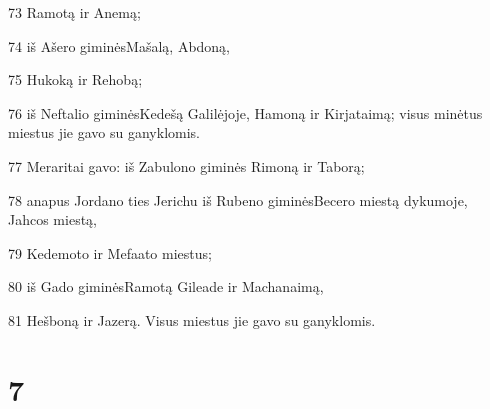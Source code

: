 \par 73 Ramotą ir Anemą; 
\par 74 iš Ašero giminės­Mašalą, Abdoną, 
\par 75 Hukoką ir Rehobą; 
\par 76 iš Neftalio giminės­Kedešą Galilėjoje, Hamoną ir Kirjataimą; visus minėtus miestus jie gavo su ganyklomis. 
\par 77 Meraritai gavo: iš Zabulono giminės Rimoną ir Taborą; 
\par 78 anapus Jordano ties Jerichu iš Rubeno giminės­Becero miestą dykumoje, Jahcos miestą, 
\par 79 Kedemoto ir Mefaato miestus; 
\par 80 iš Gado giminės­Ramotą Gileade ir Machanaimą, 
\par 81 Hešboną ir Jazerą. Visus miestus jie gavo su ganyklomis.



\chapter{7}


